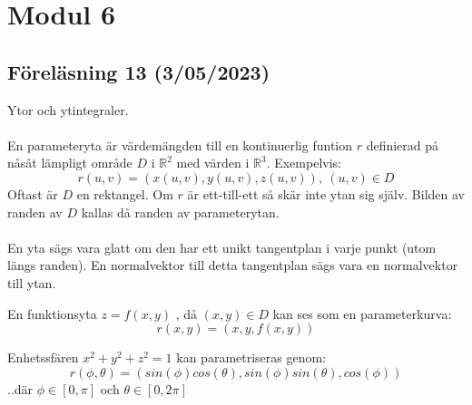 \documentclass{report}
\begin{document}
\pagebreak
\chapter{Modul 6}
\section{Föreläsning 13 (3/05/2023)}
Ytor och ytintegraler.\\\\

{
	En parameteryta är värdemängden till en kontinuerlig funtion $ r $ definierad på nåsåt lämpligt område $ D $ i $ \mathbb{R}^2$ med värden i $ \mathbb{R}^3 $. Exempelvis:
\begin{equation*}
r(u,v) = (x(u,v), y(u,v), z(u,v)), \: (u,v) \in D
\end{equation*}
Oftast är $ D $ en rektangel. Om $ r $ är ett-till-ett så skär inte ytan sig själv. Bilden av randen av $ D $ kallas då randen av parameterytan.\\\\

En yta sägs vara glatt om den har ett unikt tangentplan i varje punkt (utom längs randen). En normalvektor till detta tangentplan sägs vara en normalvektor till ytan.
}

{
En funktionsyta $ z = f(x,y) $ , då $ (x,y) \in D $ kan ses som en parameterkurva:
\begin{equation*}
r(x,y) = (x,y,f(x,y))
\end{equation*}
}

{
Enhetssfären $ x^2+y^2+z^2 = 1 $ kan parametriseras genom:
\begin{equation*}
r(\phi, \theta) = (sin(\phi)cos(\theta), sin(\phi)sin(\theta), cos(\phi))
\end{equation*}
..där $ \phi \in [0, \pi] $ och $ \theta \in [0,2\pi]  $ 
}
\end{document}
